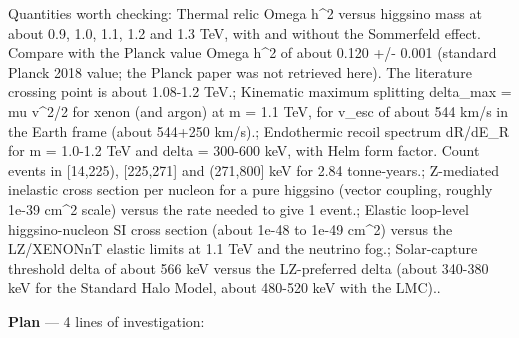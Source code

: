 \documentclass[11pt,a4paper]{article}
\begin{document}
Quantities worth checking: Thermal relic Omega h\textasciicircum{}2 versus higgsino mass at about 0.9, 1.0, 1.1, 1.2 and 1.3 TeV, with and without the Sommerfeld effect. Compare with the Planck value Omega h\textasciicircum{}2 of about 0.120 +/- 0.001 (standard Planck 2018 value; the Planck paper was not retrieved here). The literature crossing point is about 1.08-1.2 TeV.; Kinematic maximum splitting delta\_max = mu v\textasciicircum{}2/2 for xenon (and argon) at m = 1.1 TeV, for v\_esc of about 544 km/s in the Earth frame (about 544+250 km/s).; Endothermic recoil spectrum dR/dE\_R for m = 1.0-1.2 TeV and delta = 300-600 keV, with Helm form factor. Count events in [14,225), [225,271] and (271,800] keV for 2.84 tonne-years.; Z-mediated inelastic cross section per nucleon for a pure higgsino (vector coupling, roughly 1e-39 cm\textasciicircum{}2 scale) versus the rate needed to give 1 event.; Elastic loop-level higgsino-nucleon SI cross section (about 1e-48 to 1e-49 cm\textasciicircum{}2) versus the LZ/XENONnT elastic limits at 1.1 TeV and the neutrino fog.; Solar-capture threshold delta of about 566 keV versus the LZ-preferred delta (about 340-380 keV for the Standard Halo Model, about 480-520 keV with the LMC)..

\textbf{Plan} --- 4 lines of investigation:
\end{document}
